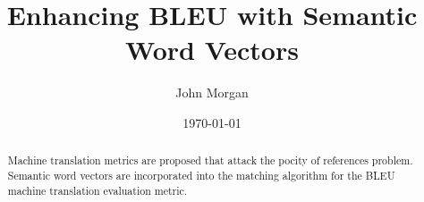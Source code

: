\documentclass{article}
\title{Enhancing BLEU  with Semantic Word Vectors}
\author{John Morgan}
\date{\today}
\begin{document}
\maketitle
\begin{abstract}
Machine translation metrics are proposed that attack the pocity of references problem. 
Semantic word vectors are incorporated into the matching algorithm for the BLEU machine translation evaluation metric. 

\end{abstract}





\newpage



\end{document}
